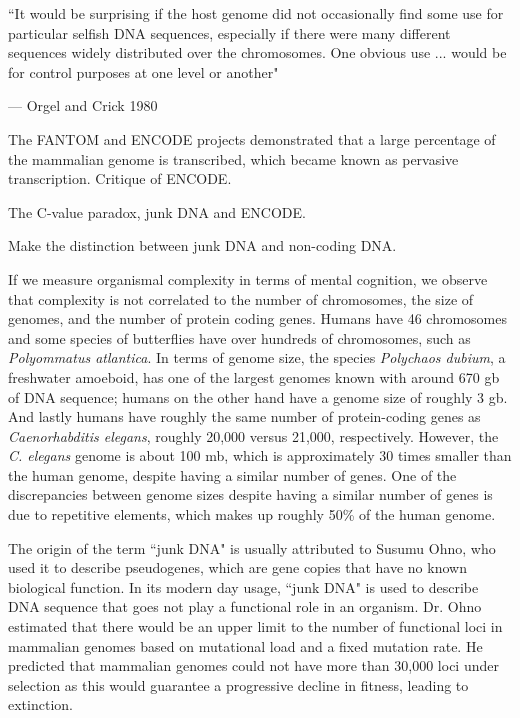 \epigraph{``It would be surprising if the host genome did not occasionally find some use for particular selfish DNA sequences, especially if there were many different sequences widely distributed over the chromosomes. One obvious use ... would be for control purposes at one level or another"}{--- \textup{Orgel and Crick 1980}\cite{orgel1980selfish}}

The FANTOM and ENCODE projects demonstrated that a large percentage of the mammalian genome is transcribed, which became known as pervasive transcription\cite{pmid21765801}. Critique of ENCODE\cite{pmid23431001, pmid23479647, pmid23137679}.

The C-value paradox, junk DNA and ENCODE\cite{Eddy2012}.

Make the distinction between junk DNA and non-coding DNA.

If we measure organismal complexity in terms of mental cognition, we observe that complexity is not correlated to the number of chromosomes, the size of genomes, and the number of protein coding genes. Humans have 46 chromosomes and some species of butterflies have over hundreds of chromosomes, such as \textit{Polyommatus atlantica}. In terms of genome size, the species \textit{Polychaos dubium}, a freshwater amoeboid, has one of the largest genomes known with around 670 gb of DNA sequence; humans on the other hand have a genome size of roughly 3 gb. And lastly humans have roughly the same number of protein-coding genes as \textit{Caenorhabditis elegans}, roughly 20,000 versus 21,000, respectively. However, the \textit{C. elegans} genome is about 100 mb\cite{celegans1998sequencing}, which is approximately 30 times smaller than the human genome, despite having a similar number of genes. One of the discrepancies between genome sizes despite having a similar number of genes is due to repetitive elements, which makes up roughly 50\% of the human genome.

The origin of the term ``junk DNA" is usually attributed to Susumu Ohno\cite{pmid5065367}, who used it to describe pseudogenes, which are gene copies that have no known biological function. In its modern day usage, ``junk DNA" is used to describe DNA sequence that goes not play a functional role in an organism. Dr. Ohno estimated that there would be an upper limit to the number of functional loci in mammalian genomes based on mutational load and a fixed mutation rate. He predicted that mammalian genomes could not have more than 30,000 loci under selection as this would guarantee a progressive decline in fitness, leading to extinction.

